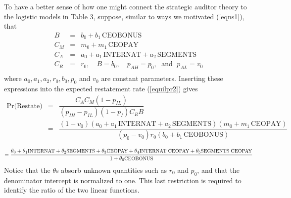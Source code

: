 \documentclass[14pt]{article}
\begin{document}
To have a better sense of how one might connect the strategic auditor theory to the
logistic models in Table 3, suppose, similar to ways we motivated (\ref{eqns1}), that 
\begin{equation}\begin{array}{lcl}\label{eqns1}
B & = & b_0 + b_1 \, \mbox{CEOBONUS} \\[.5em]
C_M & = & m_0 + m_1 \, \mbox{CEOPAY} \\[.5em]
C_A & = & a_0 + a_1 \, \mbox{INTERNAT} + a_2 \, \mbox{SEGMENTS}\\[.5em]
C_R & = & r_0, \quad B  =  b_0, \quad p_{AH}   =  p_0, \; \mbox{ and } \; p_{AL}  =  v_0 \\[.5em]
\end{array}
\end{equation}
where $ a_0, a_1, a_2, r_0, b_0, p_0$ and $v_0$ are constant parameters. 
Inserting these expressions into the expected restatement rate (\ref{equilpr2}) gives
\begin{equation*} \label{equilpr3}
\begin{array}{lcl}
\mbox{Pr(Restate)}& = &  \dfrac{C_AC_M(1-p_{IL})}{(p_{IH}-p_{IL})(1-p_I)C_RB}\\[2em]
& = & \dfrac{(1-v_0)(a_0 + a_1 \, \mbox{INTERNAT} + a_2 \, \mbox{SEGMENTS})(m_0 + m_1 \, \mbox{CEOPAY})}
{(p_0-v_0)r_0(b_0 + b_1 \, \mbox{CEOBONUS})}\\[2em]
\end{array}
\end{equation*}
\begin{equation}\label{equilpr4}
 =  \dfrac{\theta_0 + \theta_1\mbox{\small INTERNAT} + \theta_2\mbox{\small SEGMENTS} + \theta_3\mbox{\small CEOPAY}
+ \theta_4\mbox{\small INTERNAT}\; \mbox{\small CEOPAY}+ \theta_5\mbox{\small SEGMENTS}\; \mbox{\small CEOPAY}}
{1 +  \theta_6\mbox{\small CEOBONUS}}
\end{equation}
Notice that the $\theta$s absorb unknown quantities such as $r_0$ and $p_0$, and that the denominator intercept
is normalized to one. This last restriction is required to identify the ratio of the two linear functions.
\end{document}
